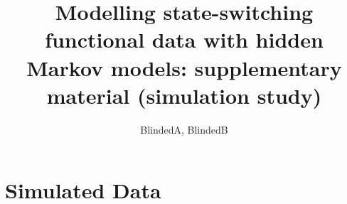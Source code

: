 \documentclass{article}
\begin{document}



\title{Modelling state-switching functional data with hidden Markov models: supplementary material (simulation study)}%
\date{}
\author{BlindedA, BlindedB}%


\maketitle

\addtocounter{tablenum}{1}
\addtocounter{fignum}{1}


    \section{Simulated Data}
    
\end{document}
